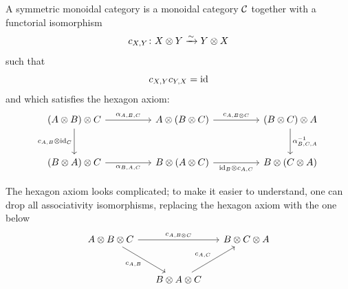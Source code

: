 \begin{definition}\label{d:symmetric}
  A symmetric monoidal category is a monoidal category $\mathcal{C}$ together
  with a functorial isomorphism
  $$
    c_{X,Y}\colon X\otimes Y \xrightarrow{\sim} Y\otimes X
  $$
  such that
  $$
  c_{X,Y} c_{Y,X}=\operatorname{id}
  $$
  and which satisfies the hexagon axiom:
  \begin{equation}\label{e:hexagon1}
    \begin{tikzcd}[column sep=huge, row sep=large]
      (A\otimes B)\otimes C
      \arrow[r,"\alpha_{A,B,C}"]
      \arrow[d,"c_{A,B}\otimes \mathrm{id}_C"']
      & A\otimes(B\otimes C)
      \arrow[r,"c_{A,B\otimes C}"]
      & (B\otimes C)\otimes A
      \arrow[d,"\alpha^{-1}_{B,C,A}"] \\
      (B\otimes A)\otimes C
      \arrow[r,"\alpha_{B,A,C}"']
      & B\otimes(A\otimes C)
      \arrow[r,"\mathrm{id}_B\otimes c_{A,C}"']
      & B\otimes(C\otimes A)
    \end{tikzcd}
  \end{equation}
\end{definition}
The hexagon axiom looks complicated; to make it easier to understand, one
can drop all associativity isomorphisms, replacing the hexagon axiom with the
one below
\begin{equation}\label{e:hexagon3}
  \begin{tikzcd}[column sep=5mm, row sep=large]
    A\otimes B\otimes C
    \arrow[rr,"c_{A, B\otimes C}"]
    \arrow[dr,"c_{A,B}"']
    && B\otimes C\otimes A\\
    & B\otimes A\otimes C
    \arrow[ur,"c_{A,C}"]  &
  \end{tikzcd}
\end{equation}

